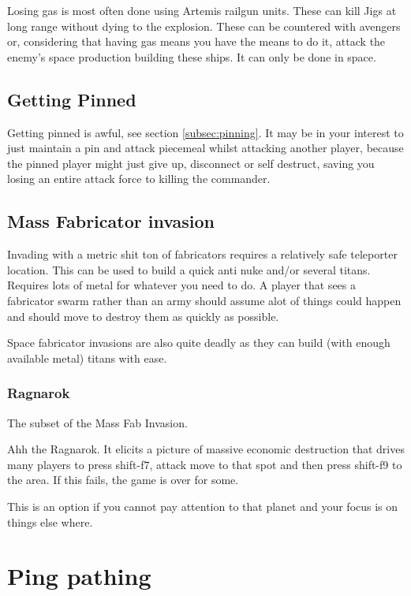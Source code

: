 \documentclass[]{article}
\begin{document}
Losing gas is most often done using Artemis railgun units.  These can kill Jigs at long range without dying to the explosion.  These can be countered with avengers or, considering that having gas means you have the means to do it, attack the enemy's space production building these ships.  It can only be done in space.

\subsection{Getting Pinned}


Getting pinned is awful, see section \ref{subsec:pinning}.  It may be in your interest to just maintain a pin and attack piecemeal whilst attacking another player, because the pinned player might just give up, disconnect or self destruct, saving you losing an entire attack force to killing the commander.  





\subsection{Mass Fabricator invasion}

Invading with a metric shit ton of fabricators requires a relatively safe teleporter location.  This can be used to build a quick anti nuke and/or several titans. Requires lots of metal for whatever you need to do.  A player that sees a fabricator swarm rather than an army should assume alot of things could happen and should move to destroy them as quickly as possible.

Space fabricator invasions are also quite deadly as they can build (with enough available metal) titans with ease.    

\subsubsection{Ragnarok}
The subset of the Mass Fab Invasion.  

Ahh the Ragnarok.  It elicits a picture of massive economic destruction that drives many players to press shift-f7, attack move to that spot and then press shift-f9 to the area.  If this fails, the game is over for some.  

This is an option if you cannot pay attention to that planet and your focus is on things else where.  
\newpage
\section{Ping pathing}
\end{document}
